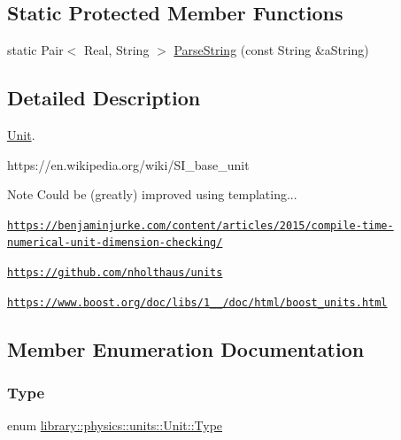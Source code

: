 \subsection*{Static Protected Member Functions}
\begin{DoxyCompactItemize}
\item 
static Pair$<$ Real, String $>$ \hyperlink{classlibrary_1_1physics_1_1units_1_1_unit_a57e8185f8acde6bfabbec6e3d22040e9}{Parse\+String} (const String \&a\+String)
\end{DoxyCompactItemize}


\subsection{Detailed Description}
\hyperlink{classlibrary_1_1physics_1_1units_1_1_unit}{Unit}. 

https\+://en.wikipedia.\+org/wiki/\+S\+I\+\_\+base\+\_\+unit

\begin{DoxyNote}{Note}
Could be (greatly) improved using templating... 

\href{https://benjaminjurke.com/content/articles/2015/compile-time-numerical-unit-dimension-checking/}{\tt https\+://benjaminjurke.\+com/content/articles/2015/compile-\/time-\/numerical-\/unit-\/dimension-\/checking/} 

\href{https://github.com/nholthaus/units}{\tt https\+://github.\+com/nholthaus/units} 

\href{https://www.boost.org/doc/libs/1_67_0/doc/html/boost_units.html}{\tt https\+://www.\+boost.\+org/doc/libs/1\+\_\+\_/doc/html/boost\+\_\+units.\+html} 
\end{DoxyNote}


\subsection{Member Enumeration Documentation}
\mbox{\label{classlibrary_1_1physics_1_1units_1_1_unit_a828bc1b6ad6fa5cbef904ea0fede986a}} 
\subsubsection{\texorpdfstring{Type}{Type}}
{\footnotesize\ttfamily enum \hyperlink{classlibrary_1_1physics_1_1units_1_1_unit_a828bc1b6ad6fa5cbef904ea0fede986a}{library\+::physics\+::units\+::\+Unit\+::\+Type}\hspace{0.3cm}{\ttfamily [strong]}}

